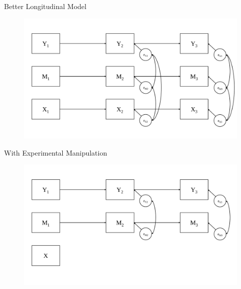 \documentclass{beamer}
\begin{document}
\begin{frame}{Better Longitudinal Model}

  \begin{figure}
    \includegraphics[width=\textwidth]{figures/threeWaveStructure.pdf}
  \end{figure}

\end{frame}


\begin{frame}{With Experimental Manipulation}

  \begin{figure}
    \includegraphics[width=\textwidth]{figures/threeWaveExpStructure.pdf}
  \end{figure}

\end{frame}
\end{document}
